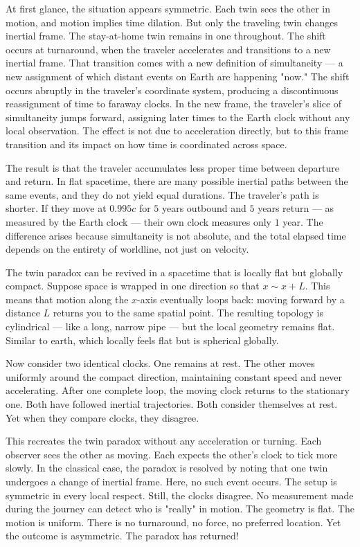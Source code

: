 At first glance, the situation appears symmetric. Each twin sees the other in motion, and motion implies time dilation. But only the traveling twin changes inertial frame. The stay-at-home twin remains in one throughout. The shift occurs at turnaround, when the traveler accelerates and transitions to a new inertial frame. That transition comes with a new definition of simultaneity — a new assignment of which distant events on Earth are happening "now." The shift occurs abruptly in the traveler's coordinate system, producing a discontinuous reassignment of time to faraway clocks. In the new frame, the traveler's slice of simultaneity jumps forward, assigning later times to the Earth clock without any local observation. The effect is not due to acceleration directly, but to this frame transition and its impact on how time is coordinated across space.

The result is that the traveler accumulates less proper time between departure and return. In flat spacetime, there are many possible inertial paths between the same events, and they do not yield equal durations. The traveler's path is shorter. If they move at $0.995c$ for $5$ years outbound and $5$ years return — as measured by the Earth clock — their own clock measures only $1$ year. The difference arises because simultaneity is not absolute, and the total elapsed time depends on the entirety of worldline, not just on velocity.

The twin paradox can be revived in a spacetime that is locally flat but globally compact. Suppose space is wrapped in one direction so that $x \sim x + L$. This means that motion along the $x$-axis eventually loops back: moving forward by a distance $L$ returns you to the same spatial point. The resulting topology is cylindrical — like a long, narrow pipe — but the local geometry remains flat. Similar to earth, which locally feels flat but is spherical globally.

Now consider two identical clocks. One remains at rest. The other moves uniformly around the compact direction, maintaining constant speed and never accelerating. After one complete loop, the moving clock returns to the stationary one. Both have followed inertial trajectories. Both consider themselves at rest. Yet when they compare clocks, they disagree.

This recreates the twin paradox without any acceleration or turning. Each observer sees the other as moving. Each expects the other's clock to tick more slowly. In the classical case, the paradox is resolved by noting that one twin undergoes a change of inertial frame. Here, no such event occurs. The setup is symmetric in every local respect. Still, the clocks disagree. No measurement made during the journey can detect who is "really" in motion. The geometry is flat. The motion is uniform. There is no turnaround, no force, no preferred location. Yet the outcome is asymmetric. The paradox has returned!

